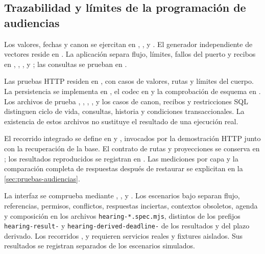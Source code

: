 \subsection{Trazabilidad y límites de la programación de audiencias}\label{sec:matriz-audiencias}

{\raggedright Los valores, fechas y canon se ejercitan en , ,  y . El generador independiente de vectores reside en . La aplicación separa flujo, límites, fallos del puerto y recibos en , , ,  y ; las consultas se prueban en .\par}

{\raggedright Las pruebas HTTP residen en , con casos de valores, rutas y límites del cuerpo. La persistencia se implementa en , el codec en  y la comprobación de esquema en . Los archivos de prueba , , , ,  y los casos de canon, recibos y restricciones SQL distinguen ciclo de vida, consultas, historia y condiciones transaccionales. La existencia de estos archivos no sustituye el resultado de una ejecución real.\par}

{\raggedright El recorrido integrado se define en  y , invocados por la demostración HTTP junto con la recuperación de la base. El contrato de rutas y proyecciones se conserva en ; los resultados reproducidos se registran en . Las mediciones por capa y la comparación completa de respuestas después de restaurar se explicitan en la \cref{sec:pruebas-audiencias}.\par}

{\raggedright La interfaz se comprueba mediante , ,  y . Los escenarios bajo  separan flujo, referencias, permisos, conflictos, respuestas inciertas, contextos obsoletos, agenda y composición en los archivos \texttt{hearing-*.spec.mjs}, distintos de los prefijos \texttt{hearing-result-} y \texttt{hearing-derived-deadline-} de los resultados y del plazo derivado. Los recorridos ,  y  requieren servicios reales y fixtures aislados. Sus resultados se registran separados de los escenarios simulados.\par}

